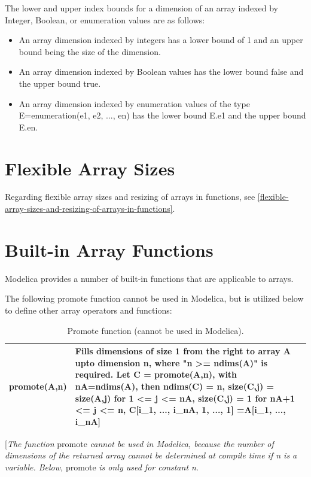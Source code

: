 \documentclass[10pt,a4paper]{report}
\def\doublelabel#1{\label{#1}}
\begin{document}
The lower and upper index bounds for a dimension of an array indexed by
Integer, Boolean, or enumeration values are as follows:

\begin{itemize}
\item
  An array dimension indexed by integers has a lower bound of 1 and an
  upper bound being the size of the dimension.
\item
  An array dimension indexed by Boolean values has the lower bound false
  and the upper bound true.
\item
  An array dimension indexed by enumeration values of the type
  E=enumeration(e1, e2, ..., en) has the lower bound E.e1 and the upper
  bound E.en.
\end{itemize}

\section{Flexible Array Sizes}\doublelabel{flexible-array-sizes}

Regarding flexible array sizes and resizing of arrays in functions, see
\ref{flexible-array-sizes-and-resizing-of-arrays-in-functions}.

\section{Built-in Array Functions}\doublelabel{built-in-array-functions}

Modelica provides a number of built-in functions that are applicable to
arrays.

The following promote function cannot be used in Modelica, but is
utilized below to define other array operators and functions:

\begin{longtable}[]{|l|p{9cm}|}
\caption{Promote function (cannot be used in Modelica).}\\
\hline \endhead
promote(A,n) & Fills dimensions of size 1 from the right to array A upto
dimension n, where "n \textgreater{}= ndims(A)" is required. Let C =
promote(A,n), with nA=ndims(A), then ndims(C) = n, size(C,j) = size(A,j)
for 1 \textless{}= j \textless{}= nA, size(C,j) = 1 for nA+1 <= j <= n, C{[}i\_1, ..., i\_nA, 1, ..., 1{]} =A{[}i\_1, ..., i\_nA{]}\\ \hline
\end{longtable}

{[}\emph{The function} promote \emph{cannot be used in Modelica, because
the number of dimensions of the returned array cannot be determined at
compile time if n is a variable. Below,} promote \emph{is only used for
constant n}.
\end{document}
